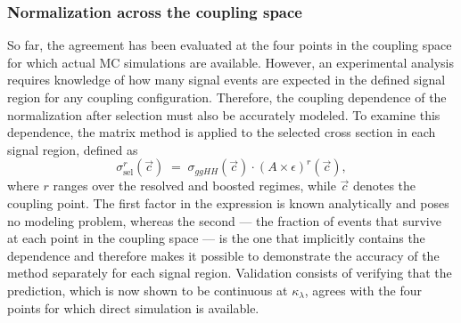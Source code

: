 \subsubsection{Normalization across the coupling space}
%
So far, the agreement has been evaluated at the four points in the coupling space for which actual MC simulations are available. However, an experimental analysis requires knowledge of how many signal events are expected in the defined signal region for any coupling configuration. Therefore, the coupling dependence of the normalization after selection must also be accurately modeled. To examine this dependence, the matrix method is applied to the selected cross section in each signal region, defined as
\begin{equation}
    \sigma^{r}_\text{sel}(\vec{c}) \;=\; \sigma_{ggHH}(\vec{c})\cdot (A\times\epsilon)^{r}(\vec{c}),
    \label{eq:sigmasel}
\end{equation}
where $r$ ranges over the resolved and boosted regimes, while $\vec{c}$ denotes the coupling point. The first factor in the expression is known analytically and poses no modeling problem, whereas the second — the fraction of events that survive at each point in the coupling space — is the one that implicitly contains the dependence and therefore makes it possible to demonstrate the accuracy of the method separately for each signal region. Validation consists of verifying that the prediction, which is now shown to be continuous at $\kappa_\lambda$, agrees with the four points for which direct simulation is available.

